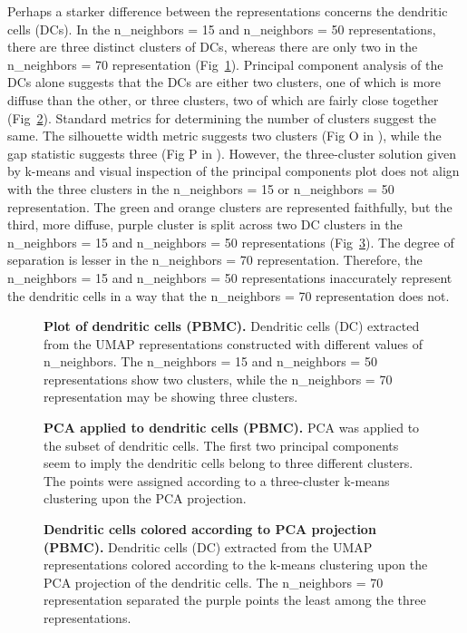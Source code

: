 \documentclass[10pt,letterpaper]{article}
\begin{document}
Perhaps a starker difference between the representations concerns the dendritic cells (DCs). In the n\_neighbors = 15 and n\_neighbors = 50 representations, there are three distinct clusters of DCs, whereas there are only two in the n\_neighbors = 70 representation (Fig~\ref{fig18}). Principal component analysis of the DCs alone suggests that the DCs are either two clusters, one of which is more diffuse than the other, or three clusters, two of which are fairly close together (Fig~\ref{fig19}). Standard metrics for determining the number of clusters suggest the same. The silhouette width metric suggests two clusters (Fig O in ), while the gap statistic suggests three (Fig P in ). However, the three-cluster solution given by k-means and visual inspection of the principal components plot does not align with the three clusters in the n\_neighbors = 15 or n\_neighbors = 50 representation. The green and orange clusters are represented faithfully, but the third, more diffuse, purple cluster is split across two DC clusters in the n\_neighbors = 15 and n\_neighbors = 50 representations (Fig~\ref{fig20}). The degree of separation is lesser in the n\_neighbors = 70 representation. Therefore, the n\_neighbors = 15 and n\_neighbors = 50 representations inaccurately represent the dendritic cells in a way that the n\_neighbors = 70 representation does not.

\begin{figure}[!h]
\caption{{\bf Plot of dendritic cells (PBMC).}
Dendritic cells (DC) extracted from the UMAP representations constructed with different values of n\_neighbors. The n\_neighbors = 15 and n\_neighbors = 50 representations show two clusters, while the n\_neighbors = 70 representation may be showing three clusters.}
\label{fig18}
\end{figure}

\begin{figure}[!h]
\caption{{\bf PCA applied to dendritic cells (PBMC).}
PCA was applied to the subset of dendritic cells. The first two principal components seem to imply the dendritic cells belong to three different clusters. The points were assigned according to a three-cluster k-means clustering upon the PCA projection. }
\label{fig19}
\end{figure}

\begin{figure}[!h]
\caption{{\bf Dendritic cells colored according to PCA projection (PBMC).}
Dendritic cells (DC) extracted from the UMAP representations colored according to the k-means clustering upon the PCA projection of the dendritic cells. The n\_neighbors = 70 representation separated the purple points the least among the three representations.}
\label{fig20}
\end{figure}
\end{document}
